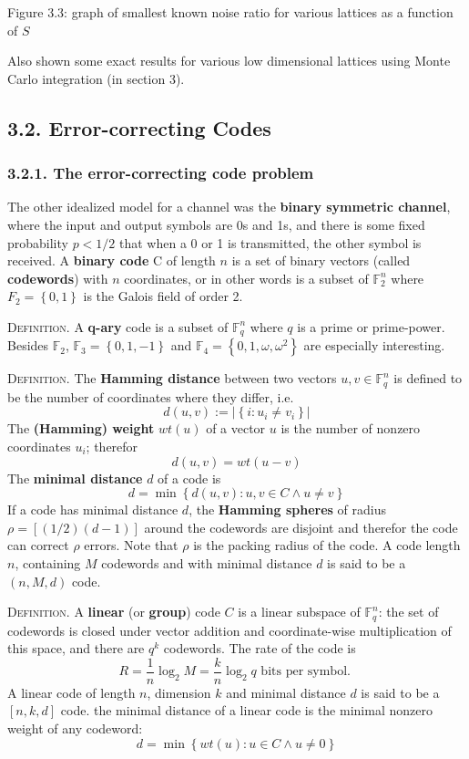 \documentclass{article}
\renewcommand{\tt}[1]{\text{ #1 }}
\newcommand{\F}{\mathbb{F}}
\renewcommand{\=}{\equiv}
\newcommand{\set}[1]{\left\{ #1 \right\}}
\newcommand{\header}[1]{\vspace{1em}\noindent\textsc{#1.} }
\begin{document}
\begin{center}
  Figure 3.3: graph of smallest known noise ratio for various lattices as a function of $S$
\end{center}

Also shown some exact results for various low dimensional lattices using Monte Carlo integration (in section 3).

\subsection*{3.2. Error-correcting Codes}

\subsubsection*{3.2.1. The error-correcting code problem}

The other idealized model for a channel was the \textbf{binary symmetric channel}, where the input and output symbols are 0s and 1s, and there is some fixed probability $p < 1/2$ that when a 0 or 1 is transmitted, the other symbol is received.
A \textbf{binary code} C of length $n$ is a set of binary vectors (called \textbf{codewords}) with $n$ coordinates, or in other words is a subset of $\F_2^n$ where $F_2 = \set{0,1}$ is the Galois field of order 2.

\header{Definition}
A \textbf{q-ary} code is a subset of $\F_q^n$ where $q$ is a prime or prime-power.
Besides $\F_2$, $\F_3 = \set{0,1,-1}$ and $\F_4 = \set{0,1,\omega,\omega^2}$ are especially interesting.

\header{Definition}
The \textbf{Hamming distance} between two vectors $u, v \in \F_q^n$ is defined to be the number of coordinates where they differ, i.e.
$$ d(u, v) := |\set{ i : u_i \neq v_i }| $$
The \textbf{(Hamming) weight} $wt(u)$ of a vector $u$ is the number of nonzero coordinates $u_i$; therefor
$$ d(u, v) = wt(u - v) $$
The \textbf{minimal distance} $d$ of a code is
$$ d = \min \set{ d(u, v) : u, v \in C \land u \neq v } $$
If a code has minimal distance $d$, the \textbf{Hamming spheres} of radius $\rho = [(1/2) (d-1)]$ around the codewords are disjoint and therefor the code can correct $\rho$ errors.
Note that $\rho$ is the packing radius of the code.
A code length $n$, containing $M$ codewords and with minimal distance $d$ is said to be a $(n, M, d)$ code.

\header{Definition}
A \textbf{linear} (or \textbf{group}) code $C$ is a linear subspace of $\F_q^n$: the set of codewords is closed under vector addition and coordinate-wise multiplication of this space, and there are $q^k$ codewords.
The rate of the code is
$$ R = \frac{1}{n} \log_2 M = \frac{k}{n} \log_2 q \tt{bits per symbol.} $$
A linear code of length $n$, dimension $k$ and minimal distance $d$ is said to be a $[n, k, d]$ code.
the minimal distance of a linear code is the minimal nonzero weight of any codeword:
$$ d = \min\set{ wt(u) : u \in C \land u \neq 0 } $$
\end{document}
